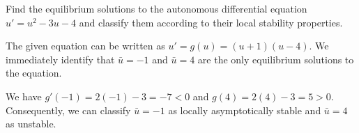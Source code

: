 \documentclass[../book.tex]{subfiles}
\begin{document}
\begin{example} \label{eg:equilibrium}
Find the equilibrium solutions to the autonomous differential equation \(u' = u^2 - 3u - 4\) and classify them according to their local stability properties.
\end{example}

\begin{solution}
The given equation can be written as \(u' = g(u) = (u+1)(u-4)\).
We immediately identify that \(\bar u = -1\) and \(\bar u= 4\) are the only equilibrium solutions to the equation.

We have \(g'(-1) = 2(-1)-3 = -7 < 0\) and \(g(4) = 2(4) - 3 = 5 >0\). Consequently, we can classify \(\bar u=-1\) as locally asymptotically stable and \(\bar u=4\) as unstable.
\end{solution}
\end{document}
